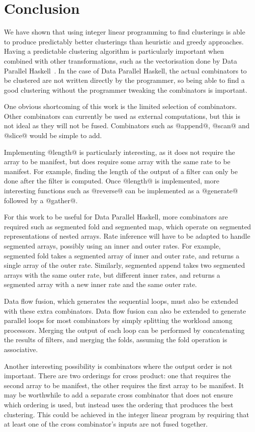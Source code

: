 \section{Conclusion}

We have shown that using integer linear programming to find clusterings is able to produce predictably better clusterings than heuristic and greedy approaches.
Having a predictable clustering algorithm is particularly important when combined with other transformations, such as the vectorisation done by Data Parallel Haskell~\cite{chakravarty2007data}.
In the case of Data Parallel Haskell, the actual combinators to be clustered are not written directly by the programmer, so being able to find a good clustering without the programmer tweaking the combinators is important.

One obvious shortcoming of this work is the limited selection of combinators.
Other combinators can currently be used as external computations, but this is not ideal as they will not be fused.
Combinators such as @append@, @scan@ and @slice@ would be simple to add.

Implementing @length@ is particularly interesting, as it does not require the array to be manifest, but does require some array with the same rate to be manifest.
For example, finding the length of the output of a filter can only be done after the filter is computed.
Once @length@ is implemented, more interesting functions such as @reverse@ can be implemented as a @generate@ followed by a @gather@.

For this work to be useful for Data Parallel Haskell, more combinators are required such as segmented fold and segmented map, which operate on segmented representations of nested arrays.
Rate inference will have to be adapted to handle segmented arrays, possibly using an inner and outer rates.
For example, segmented fold takes a segmented array of inner and outer rate, and returns a single array of the outer rate.
Similarly, segmented append takes two segmented arrays with the same outer rate, but different inner rates, and returns a segmented array with a new inner rate and the same outer rate.

Data flow fusion, which generates the sequential loops, must also be extended with these extra combinators.
Data flow fusion can also be extended to generate parallel loops for most combinators by simply splitting the workload among processors.
Merging the output of each loop can be performed by concatenating the results of filters, and merging the folds, assuming the fold operation is associative.

Another interesting possibility is combinators where the output order is not important.
There are two orderings for cross product: one that requires the second array to be manifest, the other requires the first array to be manifest.
It may be worthwhile to add a separate cross combinator that does not ensure which ordering is used, but instead uses the ordering that produces the best clustering.
This could be achieved in the integer linear program by requiring that at least one of the cross combinator's inputs are not fused together.

